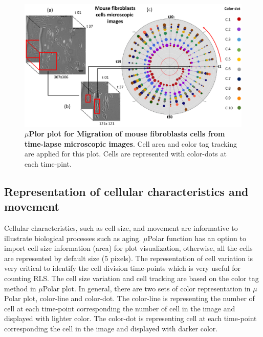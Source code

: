 \documentclass[conference]{IEEEtran}
\begin{document}
\begin{figure}
\centering
\includegraphics[width=\textwidth,height=10 cm]{Patterns/microscopic.pdf}
\caption{ \textbf{$\mu$Plor plot for Migration of mouse fibroblasts cells from time-lapse microscopic images}. Cell area and color tag tracking are applied for this plot.
Cells are represented with color-dots at each time-pint. }
\label{fig:scopic}
\end{figure}

\subsection{ Representation of cellular characteristics and movement }
Cellular characteristics, such as cell size, and movement are informative to illustrate biological processes such as aging. $\mu$Polar function has an option to import cell size information (area) for plot visualization, otherwise, all the cells are represented by default size (5 pixels). The representation of cell variation is very critical to identify the cell division time-points which is very useful for counting RLS. The cell size variation and cell tracking are based on the color tag method in $\mu$Polar plot. In general, there are two sets of color representation in $\mu$Polar plot, color-line and color-dot. The color-line is representing the number of cell at each time-point corresponding the number of cell in the image and displayed with lighter color. The color-dot is representing cell at each time-point corresponding the cell in the image and displayed with darker color.
\end{document}
